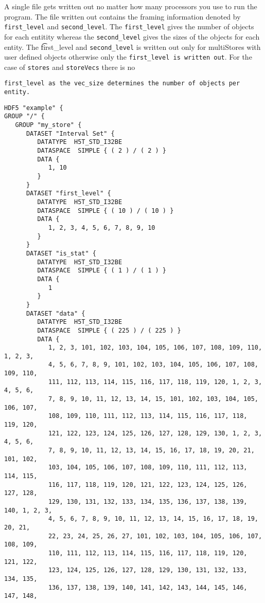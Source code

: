 %
A single file gets written out no matter how many processors you use
to run the program. The file written out contains the framing
information denoted by {\tt first\_level} and {\tt second\_level}. The
{\tt first\_level} gives the number of objects for each entitity
whereas the {\tt second\_level} gives the sizes of the objects for each
entity. The {\t first\_level} and {\tt second\_level} is written out
only for multiStores with user defined objects otherwise only the
{\tt first\_level  is written out}. For the case of {\tt stores} and
{\tt storeVecs} there is no {\tt {first\_level} as the {\tt vec\_size}
determines the number of objects per entity.     

\begin{verbatim}
HDF5 "example" {
GROUP "/" {
   GROUP "my_store" {
      DATASET "Interval Set" {
         DATATYPE  H5T_STD_I32BE  
         DATASPACE  SIMPLE { ( 2 ) / ( 2 ) } 
         DATA {
            1, 10
         } 
      } 
      DATASET "first_level" {
         DATATYPE  H5T_STD_I32BE  
         DATASPACE  SIMPLE { ( 10 ) / ( 10 ) } 
         DATA {
            1, 2, 3, 4, 5, 6, 7, 8, 9, 10
         } 
      } 
      DATASET "is_stat" {
         DATATYPE  H5T_STD_I32BE  
         DATASPACE  SIMPLE { ( 1 ) / ( 1 ) } 
         DATA {
            1
         } 
      } 
      DATASET "data" {
         DATATYPE  H5T_STD_I32BE  
         DATASPACE  SIMPLE { ( 225 ) / ( 225 ) } 
         DATA {
            1, 2, 3, 101, 102, 103, 104, 105, 106, 107, 108, 109, 110, 1, 2, 3,
            4, 5, 6, 7, 8, 9, 101, 102, 103, 104, 105, 106, 107, 108, 109, 110,
            111, 112, 113, 114, 115, 116, 117, 118, 119, 120, 1, 2, 3, 4, 5, 6,
            7, 8, 9, 10, 11, 12, 13, 14, 15, 101, 102, 103, 104, 105, 106, 107,
            108, 109, 110, 111, 112, 113, 114, 115, 116, 117, 118, 119, 120,
            121, 122, 123, 124, 125, 126, 127, 128, 129, 130, 1, 2, 3, 4, 5, 6,
            7, 8, 9, 10, 11, 12, 13, 14, 15, 16, 17, 18, 19, 20, 21, 101, 102,
            103, 104, 105, 106, 107, 108, 109, 110, 111, 112, 113, 114, 115,
            116, 117, 118, 119, 120, 121, 122, 123, 124, 125, 126, 127, 128,
            129, 130, 131, 132, 133, 134, 135, 136, 137, 138, 139, 140, 1, 2, 3,
            4, 5, 6, 7, 8, 9, 10, 11, 12, 13, 14, 15, 16, 17, 18, 19, 20, 21,
            22, 23, 24, 25, 26, 27, 101, 102, 103, 104, 105, 106, 107, 108, 109,
            110, 111, 112, 113, 114, 115, 116, 117, 118, 119, 120, 121, 122,
            123, 124, 125, 126, 127, 128, 129, 130, 131, 132, 133, 134, 135,
            136, 137, 138, 139, 140, 141, 142, 143, 144, 145, 146, 147, 148,

\end{verbatim}}
